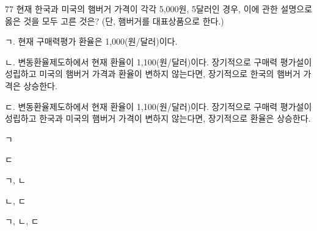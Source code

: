 \begin{question}{77}
현재 한국과 미국의 햄버거 가격이 각각 5,000원, 5달러인 경우, 이에 관한 설명으로 옳은 것을 모두 고른 것은? (단, 햄버거를 대표상품으로 한다.)
\begin{framedtext}
ㄱ. 현재 구매력평가 환율은 1,000(원/달러)이다. \par
ㄴ. 변동환율제도하에서 현재 환율이 1,100(원/달러)이다. 장기적으로 구매력 평가설이 성립하고 미국의 햄버거 가격과 환율이 변하지 않는다면, 장기적으로 한국의 햄버거 가격은 상승한다. \par
ㄷ. 변동환율제도하에서 현재 환율이 1,100(원/달러)이다. 장기적으로 구매력 평가설이 성립하고 한국과 미국의 햄버거 가격이 변하지 않는다면, 장기적으로 환율은 상승한다. \par
\end{framedtext}
\begin{choices}
  \item ㄱ
  \item ㄷ
  \item ㄱ, ㄴ
  \item ㄴ, ㄷ
  \item ㄱ, ㄴ, ㄷ
\end{choices}
\end{question}
